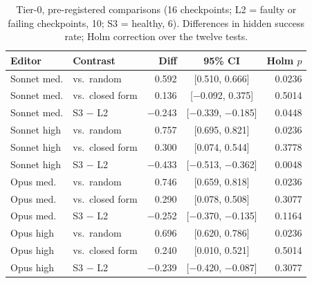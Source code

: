 \begin{table}[t]
\centering
\caption{Tier-0, pre-registered comparisons (16 checkpoints; L2 = faulty or failing checkpoints, 10; S3 = healthy, 6). Differences in hidden success rate; Holm correction over the twelve tests.}
\label{tab:t0}
\footnotesize
\setlength{\tabcolsep}{3pt}
\begin{tabular}{@{}llrcr@{}}
\toprule
Editor & Contrast & Diff & 95\% CI & Holm $p$ \\
\midrule
Sonnet med. & vs.\ random & 0.592 & [0.510, 0.666] & 0.0236 \\
Sonnet med. & vs.\ closed form & 0.136 & [$-$0.092, 0.375] & 0.5014 \\
Sonnet med. & S3 $-$ L2 & $-$0.243 & [$-$0.339, $-$0.185] & 0.0448 \\
Sonnet high & vs.\ random & 0.757 & [0.695, 0.821] & 0.0236 \\
Sonnet high & vs.\ closed form & 0.300 & [0.074, 0.544] & 0.3778 \\
Sonnet high & S3 $-$ L2 & $-$0.433 & [$-$0.513, $-$0.362] & 0.0048 \\
Opus med. & vs.\ random & 0.746 & [0.659, 0.818] & 0.0236 \\
Opus med. & vs.\ closed form & 0.290 & [0.078, 0.508] & 0.3077 \\
Opus med. & S3 $-$ L2 & $-$0.252 & [$-$0.370, $-$0.135] & 0.1164 \\
Opus high & vs.\ random & 0.696 & [0.620, 0.786] & 0.0236 \\
Opus high & vs.\ closed form & 0.240 & [0.010, 0.521] & 0.5014 \\
Opus high & S3 $-$ L2 & $-$0.239 & [$-$0.420, $-$0.087] & 0.3077 \\
\bottomrule
\end{tabular}
\end{table}

